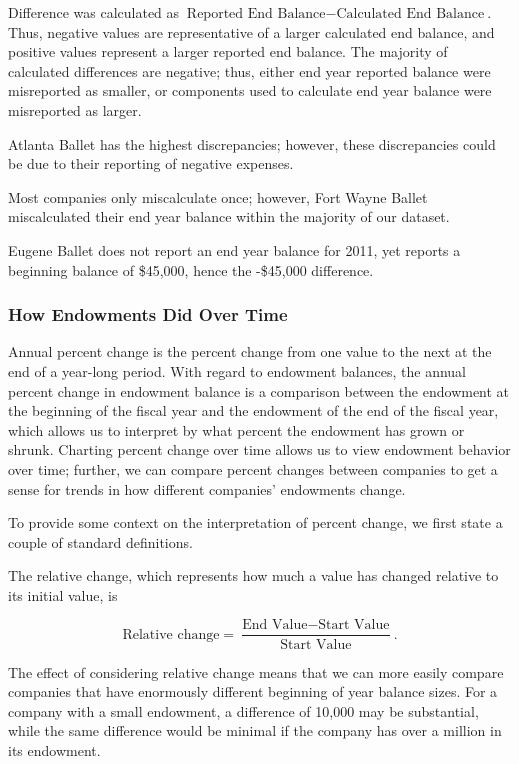 \documentclass[Dance Data
Project,article,submit,moreauthors,pdftex]{mdpi}
\begin{document}
Difference was calculated as
\(\text{Reported End Balance} - \text{Calculated End Balance}\). Thus,
negative values are representative of a larger calculated end balance,
and positive values represent a larger reported end balance. The
majority of calculated differences are negative; thus, either end year
reported balance were misreported as smaller, or components used to
calculate end year balance were misreported as larger.

Atlanta Ballet has the highest discrepancies; however, these
discrepancies could be due to their reporting of negative expenses.

Most companies only miscalculate once; however, Fort Wayne Ballet
miscalculated their end year balance within the majority of our dataset.

Eugene Ballet does not report an end year balance for 2011, yet reports
a beginning balance of \$45,000, hence the -\$45,000 difference.

\hypertarget{how-endowments-did-over-time}{%
\subsubsection{How Endowments Did Over
Time}\label{how-endowments-did-over-time}}

Annual percent change is the percent change from one value to the next
at the end of a year-long period. With regard to endowment balances, the
annual percent change in endowment balance is a comparison between the
endowment at the beginning of the fiscal year and the endowment of the
end of the fiscal year, which allows us to interpret by what percent the
endowment has grown or shrunk. Charting percent change over time allows
us to view endowment behavior over time; further, we can compare percent
changes between companies to get a sense for trends in how different
companies' endowments change.

To provide some context on the interpretation of percent change, we
first state a couple of standard definitions.

The relative change, which represents how much a value has changed
relative to its initial value, is

\[\text{Relative change} = \dfrac{\text{End Value} - \text{Start Value}}{ \text{Start Value}}.\]

The effect of considering relative change means that we can more easily
compare companies that have enormously different beginning of year
balance sizes. For a company with a small endowment, a difference of
10,000 may be substantial, while the same difference would be minimal if
the company has over a million in its endowment.
\end{document}
